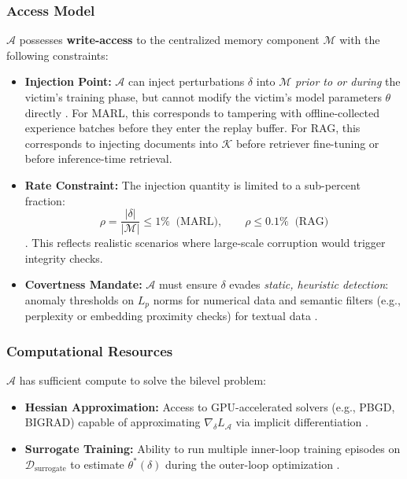 \documentclass[conference]{IEEEtran}
\begin{document}
\subsubsection{Access Model}
$\mathcal{A}$ possesses \textbf{write-access} to the centralized memory component $\mathcal{M}$ with the following constraints:

\begin{itemize}
\item \textbf{Injection Point:} $\mathcal{A}$ can inject perturbations $\delta$ into $\mathcal{M}$ \textit{prior to or during} the victim's training phase, but cannot modify the victim's model parameters $\theta$ directly \cite{Ref13, Ref25}. For MARL, this corresponds to tampering with offline-collected experience batches before they enter the replay buffer. For RAG, this corresponds to injecting documents into $\mathcal{K}$ before retriever fine-tuning or before inference-time retrieval.
\item \textbf{Rate Constraint:} The injection quantity is limited to a sub-percent fraction:
\[
\rho = \frac{|\delta|}{|\mathcal{M}|} \le 1\% \;\; \text{(MARL)}, \qquad \rho \le 0.1\% \;\; \text{(RAG)}
\]
\cite{Ref7, Ref13}. This reflects realistic scenarios where large-scale corruption would trigger integrity checks.
\item \textbf{Covertness Mandate:} $\mathcal{A}$ must ensure $\delta$ evades \textit{static, heuristic detection}: anomaly thresholds on $L_p$ norms for numerical data \cite{Ref24} and semantic filters (e.g., perplexity or embedding proximity checks) for textual data \cite{Ref29, Ref37}.
\end{itemize}

\subsubsection{Computational Resources}
$\mathcal{A}$ has sufficient compute to solve the bilevel problem:

\begin{itemize}
\item \textbf{Hessian Approximation:} Access to GPU-accelerated solvers (e.g., PBGD, BIGRAD) capable of approximating $\nabla_{\delta} L_{\mathcal{A}}$ via implicit differentiation \cite{Ref21, Ref23}.
\item \textbf{Surrogate Training:} Ability to run multiple inner-loop training episodes on $\mathcal{D}_{\text{surrogate}}$ to estimate $\theta^*(\delta)$ during the outer-loop optimization \cite{Ref20, Ref25}.
\end{itemize}
\end{document}
